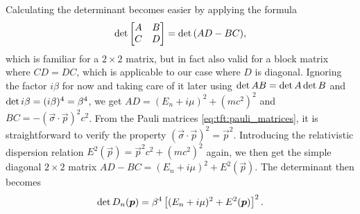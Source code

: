 Calculating the determinant becomes easier by applying the formula
\cite[theorem 3]{ref:determinant_block_matrix}
\begin{equation}
	\operatorname{det} \begin{bmatrix} A & B \\ C & D \\ \end{bmatrix} = \operatorname{det}{(AD - BC)} ,
\end{equation}
which is familiar for a $2 \times 2$ matrix, but in fact also valid for a block matrix where $CD = DC$, which is applicable to our case where $D$ is diagonal.
Ignoring the factor $i \beta$ for now and taking care of it later using $\operatorname{det} AB  = \operatorname{det}{A} \operatorname{det}{B}$ and $\operatorname{det}{i \beta} = (i \beta)^4 = \beta^4$, we get
$AD = (E_n + i \mu)^2 + (mc^2)^2$ and $BC = - (\vec{\sigma} \cdot \vec{p})^2 c^2$.
From the Pauli matrices \eqref{eq:tft:pauli_matrices}, it is straightforward to verify the property $(\vec{\sigma} \cdot \vec{p})^2 = \vec{p}^2$.
Introducing the relativistic dispersion relation $E^2(\vec{p}) = \vec{p}^2 c^2 + (mc^2)^2$ again, we then get the simple diagonal $2 \times 2$ matrix
$AD - BC = (E_n + i \mu)^2 + E^2(\vec{p})$.
The determinant then becomes
\begin{equation}
	\operatorname{det} D_n({\bm{p}}) = \beta^4 \left[ (E_n + i \mu)^2 + E^2({\bm{p}}) \right]^2 .
\end{equation}

\iffalse
\begin{equation}
\begin{split}
	\tdet D  & = \tdet \left\{ -\beta \hbar \omega_n - i \beta \mu + i \beta m c^2 \gamma^0 + i \beta c \gamma^0 \vec{\gamma} \cdot \vec{p} \right\} \\
	         & = \tdet \begin{pmatrix} 
	                 -\beta \hbar \omega_n - i \beta \mu + i \beta m c^2           & i \beta c \vec{\sigma} \cdot \vec{p}                \\ 
	                 i \beta c \vec{\sigma} \cdot \vec{p}                          & -\beta \hbar \omega_n - i \beta \mu - i \beta m c^2 \\ 
	             \end{pmatrix} \\
	         & = \tdet \left\{ (-\beta \hbar \omega_n - i \beta \mu + i \beta mc^2) (-\beta \hbar \omega_n - i \beta \mu - i \beta m c^2) + \beta^2 c^2 (\vec{\sigma} \cdot \vec{p})^2 \right\} \\
	         & = \tdet \left\{ (-\beta \hbar \omega_n - i \beta \mu)^2 + (\beta m c^2)^2 + \beta^2 c^2 \underbrace{(\vec{\sigma} \cdot \vec{p})^2}_{\vec{p}^2} \right\} \\
	         & = \tdet \left\{ \beta^2 \left[ (\hbar \omega_n + i \mu)^2 + \hbar^2 \omega^2 \right] \right\} \\
	         & = \beta^4 \left[ (\hbar \omega_n + i \mu)^2 + \hbar^2 \omega^2 \right]^2
\end{split}
\end{equation}
(TODO: to 4th or 2nd power when taking determinant of diagonal matrix?)
\fi

